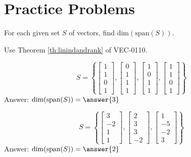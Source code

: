 \documentclass{ximera}
\begin{document}
\section*{Practice Problems}
\begin{problem}
For each given set $S$ of vectors, find $\mbox{dim}(\mbox{span}(S))$.
\begin{hint}
Use Theorem \ref{th:linindandrank} of VEC-0110.
\end{hint}
\begin{problem}\label{prob:finddimension1}
$$S=\left\{\begin{bmatrix}1\\1\\0\\1\end{bmatrix}, \begin{bmatrix}0\\1\\1\\1\end{bmatrix}, \begin{bmatrix}1\\0\\1\\1\end{bmatrix}, \begin{bmatrix}1\\1\\0\\1\end{bmatrix} \right\}$$
Answer: $\mbox{dim}(\mbox{span}(S))=\answer{3}$
\end{problem}

\begin{problem}\label{prob:finddimension2}
$$S=\left\{\begin{bmatrix}3\\-2\\1\\1\end{bmatrix}, \begin{bmatrix}2\\3\\3\\-2\end{bmatrix}, \begin{bmatrix}1\\-5\\-2\\3\end{bmatrix}\right\}$$
Answer: $\mbox{dim}(\mbox{span}(S))=\answer{2}$
\end{problem}


\end{problem}
\end{document}

